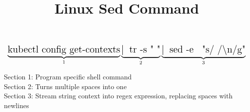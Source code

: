 \documentclass[12pt]{article}
\title{Linux Sed Command}
\begin{document}
	\[
	\Large{\underbrace{\text{kubectl config get-contexts}}_\text{1} \underbrace{\text{\textbar \: tr -s " "}}_\text{2} \underbrace{\text{\textbar \: sed -e \: "s/ /\textbackslash n/g"}}_\text{3}}
	\]
	\begin{center}
	Section 1: Program specific shell command \\ \leavevmode\newline
	Section 2: Turns multiple spaces into one \\ \leavevmode\newline
	Section 3: Stream string context into regex expression, replacing spaces with newlines
    \end{center}
\end{document}
